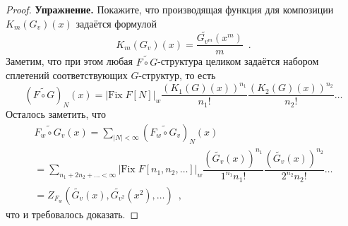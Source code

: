 \documentclass[a5paper]{article}
\theoremstyle{definition}
\begin{document}
\begin{proof}
\textbf{Упражнение.} Покажите, что производящая функция для композиции \(
K_m(G_v)(x) \) задаётся формулой
\[
    K_m(G_v)(x) = \dfrac{\widetilde{G_{v^m}}(x^m)}{m}
    \enspace .
\]
Заметим, что при этом любая \( \widetilde{F \circ G} \)-структура целиком
задаётся набором сплетений соответствующих \( G \)-структур, то есть
\[
    (\widetilde{F \circ G})_N (x) = |\mathrm{Fix} \; F[N] |_w
    \dfrac{(K_1(G)(x))^{n_1}}{n_1!}
    \dfrac{(K_2(G)(x))^{n_2}}{n_2!}\ldots
\]
Осталось заметить, что
\begin{multline*}
    \widetilde{F_w \circ G_v}(x) = \sum_{|N| < \infty} (\widetilde{F_w \circ
G_v})_N(x)\\ = \sum_{n_1 + 2 n_2 + \ldots < \infty} | \mathrm{Fix}\; F[n_1, n_2,
\ldots] |_w 
    \dfrac{\left(\widetilde{G_v}(x)\right)^{n_1}}{1^{n_1} n_1!}
    \dfrac{\left(\widetilde{G_v}(x)\right)^{n_2}}{2^{n_2} n_2!} \ldots
 \\= 
Z_{F_w} (\widetilde{G_v}(x), \widetilde{G_{v^2}} (x^2), \ldots) \enspace ,
\end{multline*}
что и требовалось доказать. 
\end{proof}


\end{document}
